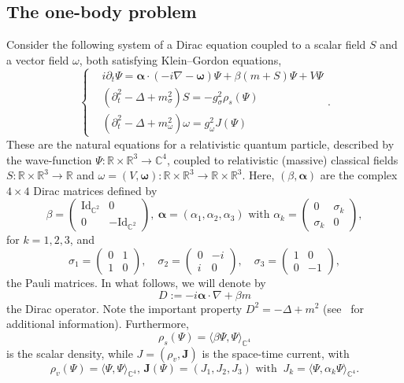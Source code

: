 \documentclass[10pt]{amsart}
\theoremstyle{definition}\newtheorem{defi}[theo]{Definition}\newtheorem{rema}[theo]{Remark}\newtheorem{exam}[theo]{Example}\newtheorem{exem}[theo]{Example}\newtheorem{nota}[theo]{Notation}
\newcommand{\rmId}{\mathrm{Id}}
\newcommand\R{\mathbb{R}}
\newcommand\C{\mathbb{C}}
\begin{document}
\subsection{The one-body problem}
Consider the following system of a Dirac equation coupled to a scalar field $S$ and a vector field $\omega$, both satisfying Klein--Gordon equations,
\begin{equation}\label{eqRMFTgeneral}
\begin{cases}
&i\partial_t \Psi=\bm \alpha \cdot (-i\nabla - \bm \omega)\Psi +\beta (m+S)\Psi +V\Psi\\
&\left(\partial^2_t-\Delta+m_\sigma^2\right)S=-g_\sigma^2\rho_s(\Psi)\\
&\left(\partial^2_t-\Delta+m_\omega^2\right)\omega=g_\omega^2 J(\Psi)
\end{cases}.
\end{equation}
These are the natural equations for a relativistic quantum particle, described by the wave-function $\Psi:\R\times \R^3\to \C^4$, coupled to relativistic (massive) classical fields $S:\R\times \R^3\to \R$ and $\omega=(V,\bm \omega):\R\times \R^3\to \R\times \R^3$. Here, $(\beta,\bm \alpha)$ are the complex $4\times 4$ Dirac matrices defined by
\begin{equation}
\beta=
\begin{pmatrix}
\rmId_{\C^2} & 0\\
0 & -\rmId_{\C^2}
\end{pmatrix},\
\bm \alpha=(\alpha_1,\alpha_2,\alpha_3) \text{ with } \alpha_k=
\begin{pmatrix}
0 & \sigma_k\\
\sigma_k & 0
\end{pmatrix},
\end{equation}
for $k=1,2,3$, and
\begin{equation}
\sigma_1=
\begin{pmatrix}
0 & 1\\
1 & 0
\end{pmatrix},\quad
\sigma_2=
\begin{pmatrix}
0 & -i\\
i & 0
\end{pmatrix},\quad
\sigma_3=
\begin{pmatrix}
1 & 0\\
0 & -1
\end{pmatrix},
\end{equation}
the Pauli matrices. In what follows, we will denote by
\begin{equation*}
D:=-i \bm \alpha \cdot \nabla +\beta m
\end{equation*}
the Dirac operator. Note the important property $D^2=-\Delta+m^2$ (see~\cite{thaller} for additional information).
Furthermore,
\begin{equation}\label{def.rhos}
\rho_s(\Psi)=\langle\beta\Psi,\Psi\rangle_{\C^4}
\end{equation}
is the scalar density, while $J=(\rho_v,\bm J)$ is the space-time current, with
\begin{equation}\label{def.j}
\rho_v(\Psi)=\langle\Psi,\Psi\rangle_{\C^4}, \,\bm J(\Psi)=(J_1,J_2,J_3) \text{ with } \ J_k=\langle\Psi,\alpha_k\Psi\rangle_{\C^4}.
\end{equation}
\end{document}
